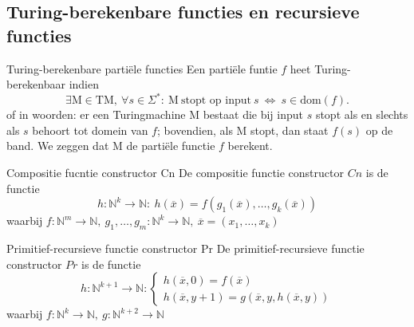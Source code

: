 \subsection{Turing-berekenbare functies en recursieve functies}

\vspace{0.5cm}

\begin{theo}{Turing-berekenbare partiële functies}
    Een partiële funtie $f$ heet Turing-berekenbaar indien
    \begin{equation*}
        \exists \text{M} \in \text{TM},\ \forall s \in \Sigma^*: \ \text{M} \ \text{stopt op input} \ s \ \Leftrightarrow \ s \in \text{dom}(f).
    \end{equation*}
    of in woorden: er een Turingmachine M bestaat die bij input $s$ stopt als en slechts als $s$ behoort tot domein van $f$; bovendien, als M stopt, dan staat $f(s)$ op de band. We zeggen dat M de partiële functie $f$ berekent.
\end{theo}

\begin{theo}{Compositie fucntie constructor Cn}
    De compositie functie constructor $Cn$ is de functie 
    \begin{equation*}
        h: \mathbb{N}^k \to \mathbb{N}: \ h(\overline{x}) = f(g_1(\overline{x}), \ldots, g_k(\overline{x}))
    \end{equation*}
    waarbij $f: \mathbb{N}^m \to \mathbb{N}, \ g_1, \ldots, g_m: \mathbb{N}^k \to \mathbb{N}, \ \overline{x} = (x_1, \ldots, x_k)$
\end{theo}

\begin{theo}{Primitief-recursieve functie constructor Pr}
    De primitief-recursieve functie constructor $Pr$ is de functie 
    \begin{equation*}
        h: \mathbb{N}^{k+1} \to \mathbb{N}: \begin{cases}
            h(\overline{x}, 0) = f(\overline{x}) \\
            h(\overline{x}, y+1) = g(\overline{x}, y, h(\overline{x}, y))
        \end{cases}
    \end{equation*}
    waarbij $f: \mathbb{N}^k \to \mathbb{N}, \ g: \mathbb{N}^{k+2} \to \mathbb{N}$
\end{theo}

